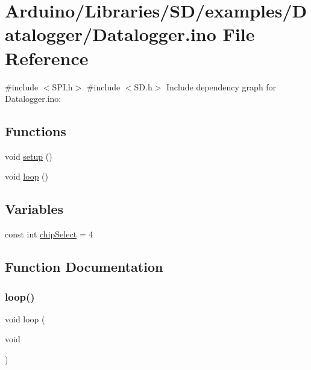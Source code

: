 \hypertarget{_datalogger_8ino}{}\section{Arduino/\+Libraries/\+S\+D/examples/\+Datalogger/\+Datalogger.ino File Reference}
\label{_datalogger_8ino}
{\ttfamily \#include $<$S\+P\+I.\+h$>$}\newline
{\ttfamily \#include $<$S\+D.\+h$>$}\newline
Include dependency graph for Datalogger.\+ino\+:
\subsection*{Functions}
\begin{DoxyCompactItemize}
\item 
void \hyperlink{_datalogger_8ino_a4fc01d736fe50cf5b977f755b675f11d}{setup} ()
\item 
void \hyperlink{_datalogger_8ino_afe461d27b9c48d5921c00d521181f12f}{loop} ()
\end{DoxyCompactItemize}
\subsection*{Variables}
\begin{DoxyCompactItemize}
\item 
const int \hyperlink{_datalogger_8ino_a266db0f4dbdfbc06ea34c96f66bebed3}{chip\+Select} = 4
\end{DoxyCompactItemize}


\subsection{Function Documentation}
\mbox{\label{_datalogger_8ino_afe461d27b9c48d5921c00d521181f12f}} 
\subsubsection{\texorpdfstring{loop()}{loop()}}
{\footnotesize\ttfamily void loop (\begin{DoxyParamCaption}\item[{void}]{ }\end{DoxyParamCaption})}

